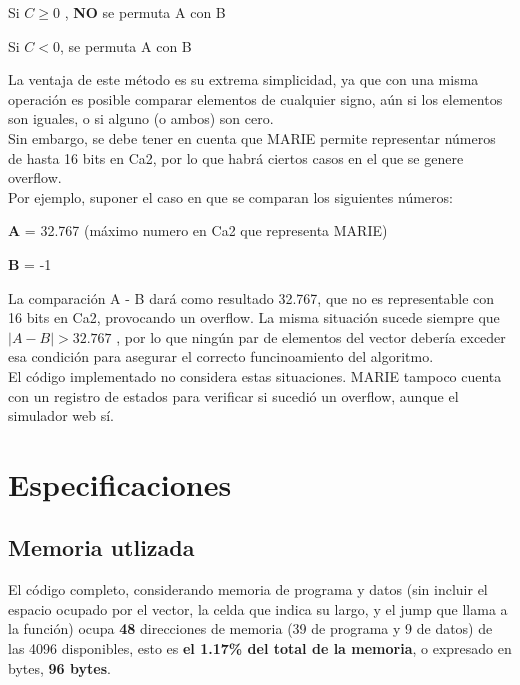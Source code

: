 \documentclass{sciposter}
\begin{document}
\begin{multicols*}{2}
\begin{center}
    Si $C \geq 0$ , \textbf{NO} se permuta A con B
\end{center}
\begin{center}
    Si $C < 0$, se permuta A con B
\end{center}
La ventaja de este método es su extrema simplicidad, ya que con una misma operación es posible comparar elementos de cualquier signo, aún si los elementos son iguales, o si alguno (o ambos) son cero.\\
Sin embargo, se debe tener en cuenta que MARIE permite representar números de hasta 16 bits en Ca2, por lo que habrá ciertos casos en el que se genere overflow.\\
Por ejemplo, suponer el caso en que se comparan los siguientes números:

\begin{center}
    \textbf{A} = 32.767 (máximo numero en Ca2 que representa MARIE)
\end{center}

\begin{center}
    \textbf{B} = -1
\end{center}

La comparación A - B dará como resultado 32.767, que no es representable con 16 bits en Ca2, provocando un overflow. La misma situación sucede siempre que \( \left| A - B \right| > 32.767 \)
, por lo que ningún par de elementos del vector debería exceder esa condición para asegurar el correcto funcinoamiento del algoritmo.\\
El código implementado no considera estas situaciones. MARIE tampoco cuenta con un registro de estados para verificar si sucedió un overflow, aunque el simulador web sí.

\section{Especificaciones}
\subsection{Memoria utlizada}
El código completo, considerando memoria de programa y datos (sin incluir el espacio ocupado por el vector, la celda que indica su largo, y el jump que llama a la función) ocupa \textbf{48} direcciones de memoria (39 de programa y 9 de datos) de las 4096 disponibles, esto es \textbf{el 1.17\%  del total de la memoria}, o expresado en bytes, \textbf{96 bytes}.\\


\end{multicols*}
\end{document}
